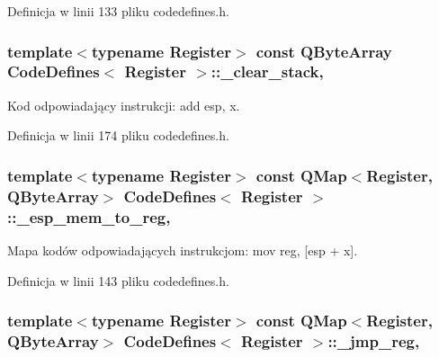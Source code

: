 Definicja w linii 133 pliku codedefines.\-h.

\hypertarget{class_code_defines_a85aef38055b98600a9d3d0ca776dcd06}{
\subsubsection[{\-\_\-clear\-\_\-stack}]{\setlength{\rightskip}{0pt plus 5cm}template$<$typename Register$>$ const Q\-Byte\-Array {\bf Code\-Defines}$<$ Register $>$\-::\-\_\-clear\-\_\-stack\hspace{0.3cm}{\ttfamily [static]}, {\ttfamily [private]}}}\label{class_code_defines_a85aef38055b98600a9d3d0ca776dcd06}


Kod odpowiadający instrukcji\-: add esp, x. 



Definicja w linii 174 pliku codedefines.\-h.

\hypertarget{class_code_defines_a500b8a706cedd1af746d05cfbb43cf0b}{
\subsubsection[{\-\_\-esp\-\_\-mem\-\_\-to\-\_\-reg}]{\setlength{\rightskip}{0pt plus 5cm}template$<$typename Register$>$ const Q\-Map$<$Register, Q\-Byte\-Array$>$ {\bf Code\-Defines}$<$ Register $>$\-::\-\_\-esp\-\_\-mem\-\_\-to\-\_\-reg\hspace{0.3cm}{\ttfamily [static]}, {\ttfamily [private]}}}\label{class_code_defines_a500b8a706cedd1af746d05cfbb43cf0b}


Mapa kodów odpowiadających instrukcjom\-: mov reg, \mbox{[}esp + x\mbox{]}. 



Definicja w linii 143 pliku codedefines.\-h.

\hypertarget{class_code_defines_a15c9e1c6383c846bf240d3de47d63424}{
\subsubsection[{\-\_\-jmp\-\_\-reg}]{\setlength{\rightskip}{0pt plus 5cm}template$<$typename Register$>$ const Q\-Map$<$Register, Q\-Byte\-Array$>$ {\bf Code\-Defines}$<$ Register $>$\-::\-\_\-jmp\-\_\-reg\hspace{0.3cm}{\ttfamily [static]}, {\ttfamily [private]}}}\label{class_code_defines_a15c9e1c6383c846bf240d3de47d63424}


